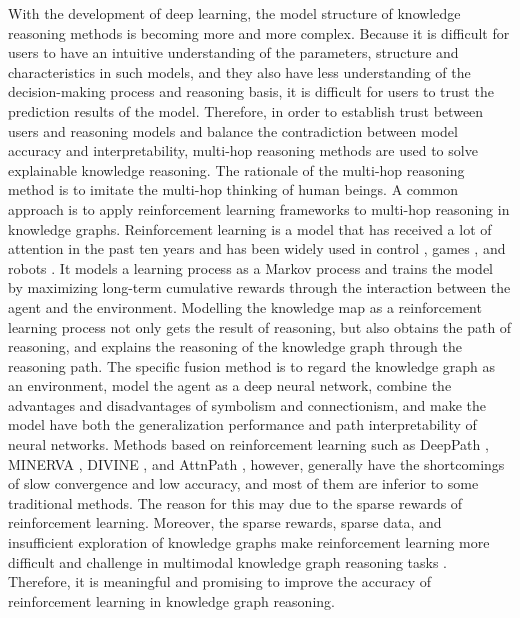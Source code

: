 \documentclass[10pt,journal,compsoc]{IEEEtran}
\begin{document}
With the development of deep learning, the model structure of knowledge reasoning methods is becoming more and more complex. Because it is difficult for users to have an intuitive understanding of the parameters, structure and characteristics in such models, and they also have less understanding of the decision-making process and reasoning basis, it is difficult for users to trust the prediction results of the model. Therefore, in order to establish trust between users and reasoning models and balance the contradiction between model accuracy and interpretability, multi-hop reasoning methods are used to solve explainable knowledge reasoning\cite{ref67}. The rationale of the multi-hop reasoning method is to imitate the multi-hop thinking of human beings. A common approach is to apply reinforcement learning frameworks to multi-hop reasoning in knowledge graphs. Reinforcement learning is a model that has received a lot of attention in the past ten years and has been widely used in control \cite{ref71}, games \cite{ref72}, and robots \cite{ref73}. It models a learning process as a Markov process and trains the model by maximizing long-term cumulative rewards through the interaction between the agent and the environment. Modelling the knowledge map as a reinforcement learning process not only gets the result of reasoning, but also obtains the path of reasoning, and explains the reasoning of the knowledge graph through the reasoning path. The specific fusion method is to regard the knowledge graph as an environment, model the agent as a deep neural network, combine the advantages and disadvantages of symbolism and connectionism, and make the model have both the generalization performance and path interpretability of neural networks. Methods based on reinforcement learning such as DeepPath  \cite{ref8}, MINERVA \cite{ref9}, DIVINE \cite{ref10}, and AttnPath \cite{ref11}, however, generally have the shortcomings of slow convergence and low accuracy, and most of them are inferior to some traditional methods. The reason for this may due to the sparse rewards of reinforcement learning. Moreover, the sparse rewards, sparse data, and insufficient exploration of knowledge graphs make reinforcement learning more difficult and challenge in multimodal knowledge graph reasoning tasks  \cite{ref65}. Therefore, it is meaningful and promising to improve the accuracy of reinforcement learning in knowledge graph reasoning.
\end{document}
